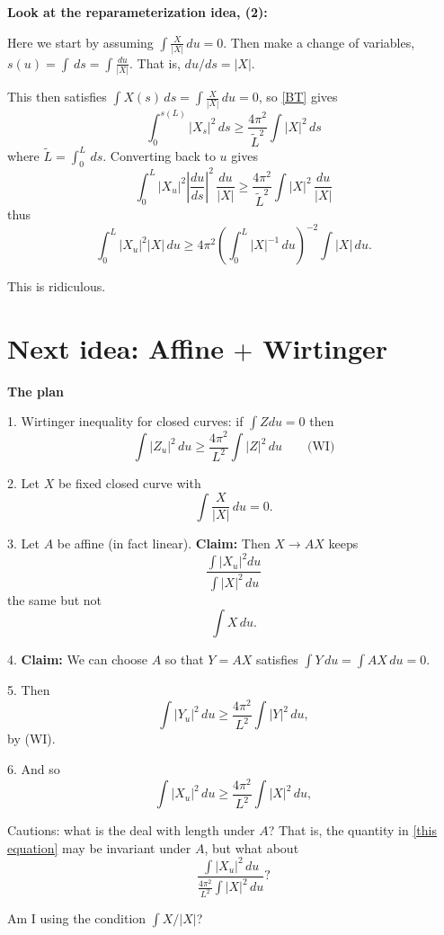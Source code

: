 \documentclass{amsart}
\begin{document}
\textbf{Look at the reparameterization idea, (2):}

Here we start by assuming  $\int \frac{X}{|X|}\,du=0$.  Then make a change of variables, $s(u)=\int \,ds=\int \frac{du}{|X|}$.   That is, $du/ds=|X|$.  

This then satisfies $\int X(s)\,ds=\int  \frac{X}{|X|}\,du=0$, so \eqref{BT} gives
\[ \int_0^{s(L)} |X_s|^2 \,ds \ge \frac{4\pi^2}{\tilde{L}^2}\int |X|^2\,ds\]
where $\tilde{L}=\int_0^L \,ds$.  Converting back to $u$ gives
\[ \int_0^{L} |X_u|^2|\frac{du}{ds}|^2 \,\frac{du}{|X|} \ge \frac{4\pi^2}{\tilde{L}^2}\int |X|^2\,\frac{du}{|X|}\]
thus
\[ \int_0^{L} |X_u|^2|X| \,du\ge {4\pi^2}\left(\int_0^L |X|^{-1}\,du \right)^{-2}\int |X|\,{du}.\]

This is ridiculous.

\clearpage

\section*{Next idea:  Affine $+$ Wirtinger}

\textbf{The plan}
 
 1.  Wirtinger inequality for closed curves:  if $\int Z du =0$ then 
 $$\int |Z_u|^2 \,du \ge \frac{4\pi^2}{L^2}\int |Z|^2 \,du  \quad \quad \text{(WI)}$$
 
 2.  Let $X$ be fixed closed curve with $$\int \frac{X}{|X|}\,du =0.$$
 
 3.  Let $A$ be affine (in fact linear).  \textbf{Claim: }Then $X\rightarrow AX$ keeps 
 \begin{equation}\frac{\int |X_u|^2 du }{\int |X|^2 \,du}  \label{this equation} \end{equation}
 the same but not $$\int X\,du.$$
 
 4.   \textbf{Claim:} We can choose $A$ so that $Y=AX$ satisfies $\int Y \,du =\int AX\,du=0.$
 
 5.  Then $$\int |Y_u|^2 \,du \ge \frac{4\pi^2}{L^2}\int {|Y|^2}\,du,$$ by (WI).
 
 6.  And so $$\int |X_u|^2 \,du \ge \frac{4\pi^2}{L^2}\int {|X|^2}\,du,$$


Cautions:  what is the deal with length under $A$? That is, the quantity in \eqref{this equation} may be invariant under $A$, but what about
\begin{equation}\frac{ \int |{X}_u|^2 \,du}{ \frac{4\pi^2}{L^2}\int |{X}|^2\,du } ? \end{equation}

Am I using the condition $\int X/|X|$?
\end{document}
